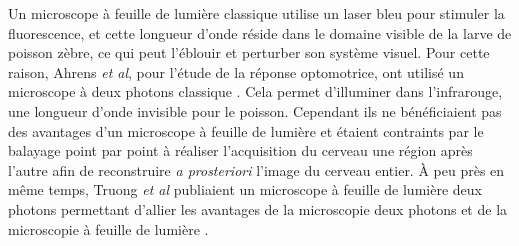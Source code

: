 

Un microscope à feuille de lumière classique utilise un laser bleu pour stimuler la fluorescence, et cette longueur d'onde réside dans le domaine visible de la larve de poisson zèbre, ce qui peut l'éblouir et perturber son système visuel. Pour cette raison, Ahrens \emph{et al}, pour l'étude de la réponse optomotrice, ont utilisé un microscope à deux photons classique \cite{ahrens_brain-wide_2012}. Cela permet d'illuminer dans l'infrarouge, une longueur d'onde invisible pour le poisson. Cependant ils ne bénéficiaient pas des avantages d'un microscope à feuille de lumière et étaient contraints par le balayage point par point à réaliser l'acquisition du cerveau une région après l'autre afin de reconstruire \emph{a prosteriori} l'image du cerveau entier. À peu près en même temps, Truong \emph{et al} publiaient un microscope à feuille de lumière deux photons permettant d'allier les avantages de la microscopie deux photons et de la microscopie à feuille de lumière \cite{truong_deep_2011}.




